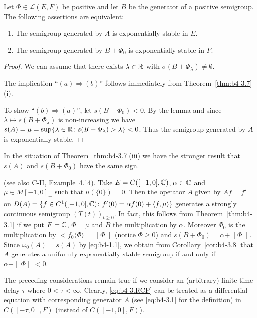 \begin{corollary}\label{cor:b4-3.8}
Let $\Phi \in \mathcal{L}(E,F)$ be positive and let $B$ be the generator of a positive semigroup. 
The following assertions are equivalent:

\begin{enumerate}[\upshape (a)]
	\item 
    The semigroup generated by $A$ is exponentially stable in $E$.
	
    \item 
    The semigroup generated by $B + \Phi_{0}$ is exponentially stable in $F$.
\end{enumerate}
\end{corollary}
\begin{proof}
We can assume that there exists $\lambda \in \mathbb{R}$ with $\sigma(B+\Phi_{\lambda}) \neq \emptyset$.

The implication \enquote{$(a)\Rightarrow(b)$} follows immediately from Theorem~\ref{thm:b4-3.7}(i).

To show \enquote{$(b)\Rightarrow(a)$}, let $s(B+\Phi_{0}) < 0$. 
By the lemma and since $\lambda \mapsto s(B+\Phi_{\lambda})$ is non-increasing we have $s(A) = \mu = \sup\{\lambda \in \mathbb{R} \colon s(B+\Phi_{\lambda}) > \lambda\} < 0$. 
Thus the semigroup generated by $A$ is exponentially stable.
\end{proof}
\begin{remark*}
In the situation of Theorem~\ref{thm:b4-3.7}(iii) we have the stronger result that $s(A)$ and $s(B + \Phi_{0})$ have the same sign.
\end{remark*}
\begin{example}\label{ex:b4-3.9}
(see also C-II, Example~4.14). Take $E = C([-1,0],\mathbb{C})$, $\alpha \in \mathbb{C}$ and $\mu \in M[-1,0]_{+}$ such that $\mu(\{0\}) = 0$. 
Then the operator $A$ given by $Af = f'$ on $D(A) = \{f \in C^1([-1,0],\mathbb{C}) \colon f'(0) = \alpha f(0) + \langle f,\mu\rangle\}$ generates a strongly continuous semigroup $(T(t))_{t\geq0}$. 
In fact, this follows from Theorem~\ref{thm:b4-3.1} if we put $F = \mathbb{C}$, $\Phi = \mu$ and $B$ the multiplication by $\alpha$. 
Moreover $\Phi_{0}$ is the multiplication by $<f_{0}\langle\Phi\rangle = \|\Phi\|$ (notice $\Phi\geq0$) and $s(B + \Phi_{0}) = \alpha + \|\Phi\|$. 
Since $\omega_{0}(A) = s(A)$ by \eqref{eq:b4-1.1}, we obtain from Corollary~\ref{cor:b4-3.8} that $A$ generates a uniformly exponentially stable semigroup if and only if $\alpha + \|\Phi\| < 0$.
\end{example}
The preceding considerations remain true if we consider an (arbitrary) finite time delay $\tau$ where $0 < \tau < \infty$. 
Clearly, \eqref{eq:b4-3.RCP} can be treated as a differential equation with corresponding generator $A$ (see \eqref{eq:b4-3.1} for the definition) in $C([-\tau,0],F)$ (instead of $C([-1,0],F)$).

